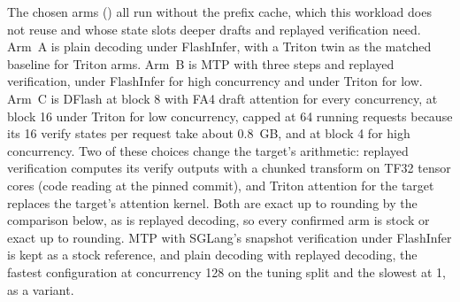 The chosen arms () all run without the prefix cache, which this workload does not reuse and whose state slots deeper drafts and replayed verification need. Arm~A is plain decoding under FlashInfer, with a Triton twin as the matched baseline for Triton arms. Arm~B is MTP with three steps and replayed verification, under FlashInfer for high concurrency and under Triton for low. Arm~C is DFlash at block 8 with FA4 draft attention for every concurrency, at block 16 under Triton for low concurrency, capped at 64 running requests because its 16 verify states per request take about 0.8~GB, and at block 4 for high concurrency. Two of these choices change the target's arithmetic: replayed verification computes its verify outputs with a chunked transform on TF32 tensor cores (code reading at the pinned commit), and Triton attention for the target replaces the target's attention kernel. Both are exact up to rounding by the comparison below, as is replayed decoding, so every confirmed arm is stock or exact up to rounding. MTP with SGLang's snapshot verification under FlashInfer is kept as a stock reference, and plain decoding with replayed decoding, the fastest configuration at concurrency 128 on the tuning split and the slowest at 1, as a variant.

